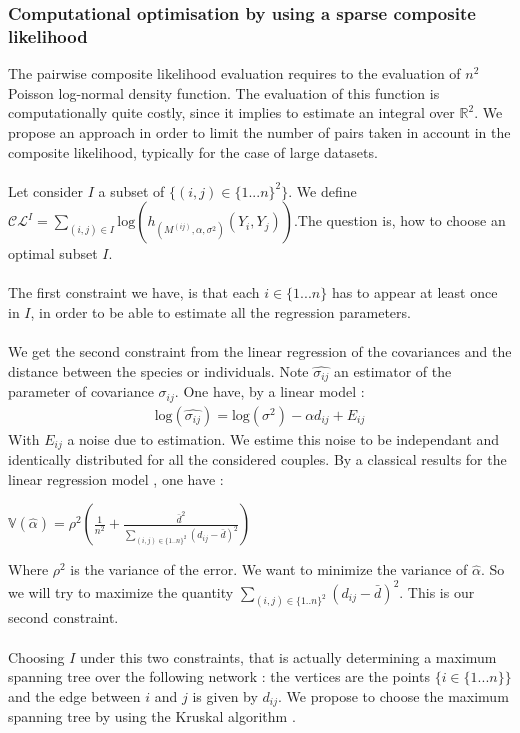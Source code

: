 \documentclass[11pt, a4paper]{article}
\begin{document}
\subsubsection{Computational optimisation by using a sparse composite likelihood} \label{sparse}
The pairwise composite likelihood evaluation requires to the evaluation of $n^2$ Poisson log-normal density function. The evaluation of this function is computationally quite costly, since it implies to estimate an integral over $\mathbb{R}^2$. We propose an approach in order to limit the number of pairs taken in account in the composite likelihood, typically for the case of large datasets. \\
\\
Let consider $I$ a subset of $\{(i,j) \in \{1...n\}^2\}$. We define $\mathcal{CL}^I = \sum_{(i,j) \in I} \mathrm{log}( h_{(M^{(ij)},\alpha,\sigma^2)}(Y_i,Y_j)) $.The question is, how to choose an optimal subset $I$.\\
\\
The first constraint we have, is that each $i \in \{1...n\}$ has to appear at least once in $I$, in order to be able to estimate all the regression parameters.\\
\\
We get the second constraint from the linear regression of the covariances and the distance between the species or individuals.
Note $\widehat{\sigma_{ij}}$ an estimator of the parameter of covariance $\sigma_{ij}$.
One have, by a linear model :
\begin{align*}
\mathrm{log}(\widehat{\sigma_{ij}}) = \mathrm{log} ( \sigma^2) - \alpha d_{ij} + E_{ij}
\end{align*}
With $E_{ij}$ a noise due to estimation. We estime this noise to be  independant and identically distributed  for all the considered couples. By a classical results for the linear regression model \cite{daudin1999statistique}, one have :
\begin{center}
$\mathbb{V}(\widehat{\alpha}) = \rho^2 (\frac{1}{n^2} + \frac{\bar{d}^2}{\sum_{(i,j)\in \{1..n\}^2}(d_{ij} - \bar{d})^2})$
\end{center}
Where $\rho^2$ is the variance of the error. We want to minimize the variance of $\widehat{\alpha}$. So we will try to maximize the quantity $\sum_{(i,j)\in \{1..n\}^2}(d_{ij} - \bar{d})^2$. This is our second constraint.\\
\\
Choosing $I$ under this two constraints, that is actually determining a maximum spanning tree over the following network : the vertices are the points $ \{i \in \{1...n\} \}$ and the edge between $i$ and $j$ is given by $d_{ij}$. We propose to choose the maximum spanning tree by using the Kruskal algorithm \cite{Kruskal1956}. 
\end{document}
